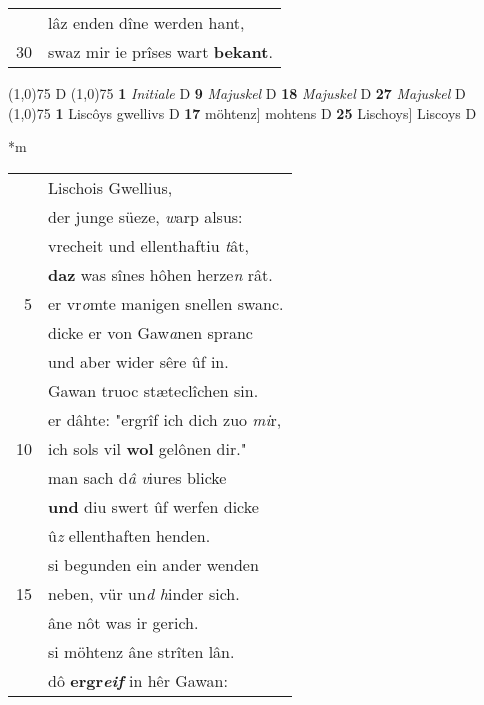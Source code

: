 \documentclass[8pt,a4paper,notitlepage]{article}
\begin{document}
\begin{table}[ht]
\begin{minipage}[t]{0.5\linewidth}
\begin{tabular}{rl}
 & lâz enden dîne werden hant,\\ 
30 & swaz mir ie prîses wart \textbf{bekant}.\\ 
\end{tabular}
\scriptsize
\line(1,0){75} \newline
D \newline
\line(1,0){75} \newline
\textbf{1} \textit{Initiale} D  \textbf{9} \textit{Majuskel} D  \textbf{18} \textit{Majuskel} D  \textbf{27} \textit{Majuskel} D  \newline
\line(1,0){75} \newline
\textbf{1} Liscôys gwellivs D \textbf{17} möhtenz] mohtens D \textbf{25} Lischoys] Liscoys D \newline
\end{minipage}
\hspace{0.5cm}
\begin{minipage}[t]{0.5\linewidth}
\small
\begin{center}*m
\end{center}
\begin{tabular}{rl}
 & Lischois Gwellius,\\ 
 & der junge süeze, \textit{w}arp alsus:\\ 
 & vrecheit und ellenthaftiu \textit{t}ât,\\ 
 & \textbf{daz} was sînes hôhen herze\textit{n} rât.\\ 
5 & er vr\textit{o}mte manigen snellen swanc.\\ 
 & dicke er von Gaw\textit{a}nen spranc\\ 
 & und aber wider sêre ûf in.\\ 
 & Gawan truoc stæteclîchen sin.\\ 
 & er dâhte: "ergrîf ich dich zuo \textit{mi}r,\\ 
10 & ich sols vil \textbf{wol} gelônen dir."\\ 
 & man sach d\textit{â} \textit{v}iures blicke\\ 
 & \textbf{und} diu swert ûf werfen dicke\\ 
 & û\textit{z} ellenthaften henden.\\ 
 & si begunden ein ander wenden\\ 
15 & neben, vür un\textit{d h}inder sich.\\ 
 & âne nôt was ir gerich.\\ 
 & si möhtenz âne strîten lân.\\ 
 & dô \textbf{ergr\textit{eif}} in hêr Gawan:\\ 

\end{tabular}
\end{minipage}
\end{table}
\end{document}
